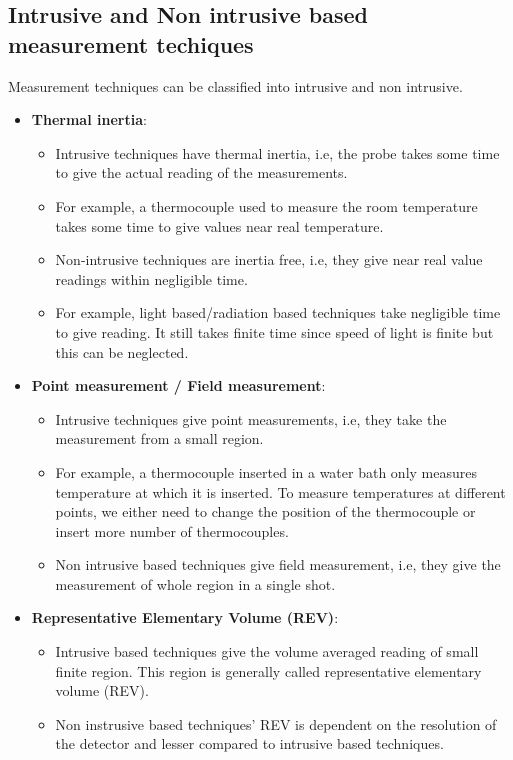 \documentclass{article}
\begin{document}
	\subsection{Intrusive and Non intrusive based measurement techiques}
	Measurement techniques can be classified into intrusive and non intrusive.
	\begin{itemize}
		\item \textbf{Thermal inertia}: 
		\begin{itemize}
			\item Intrusive techniques have thermal inertia, i.e, the probe takes some time to give the actual reading of the measurements. 
			\item For example, a thermocouple used to measure the room temperature takes some time to give values near real temperature.
			\item Non-intrusive techniques are inertia free, i.e, they give near real value readings within negligible time.
			\item For example, light based/radiation based techniques take negligible time to give reading. It still takes finite time since speed of light is finite but this can be neglected.
		\end{itemize}

		\item \textbf{Point measurement / Field measurement}:
		\begin{itemize}
			\item Intrusive techniques give point measurements, i.e, they take the measurement from a small region.
			\item For example, a thermocouple inserted in a water bath only measures temperature at which it is inserted. To measure temperatures at different points, we either need to change the position of the thermocouple or insert more number of thermocouples. 
			\item Non intrusive based techniques give field measurement, i.e, they give the measurement of whole region in a single shot.
		\end{itemize}

		\item \textbf{Representative Elementary Volume (REV)}:
		\begin{itemize}
			\item Intrusive based techniques give the volume averaged reading of small finite region. This region is generally called representative elementary volume (REV).
			\item Non instrusive based techniques' REV is dependent on the resolution of the detector and lesser compared to intrusive based techniques.
		\end{itemize}


\end{itemize}
\end{document}
